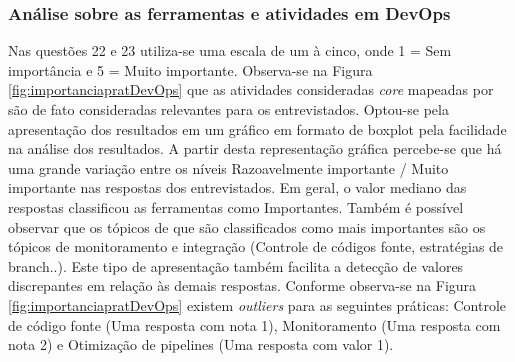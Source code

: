 \documentclass[twoside,english,brazilian]{UNISINOSartigo}
\begin{document}
\subsubsection{Análise sobre as ferramentas e atividades em DevOps}
Nas questões 22 e 23 utiliza-se uma escala de um à cinco, onde 1 = Sem importância e 5 = Muito importante.
Observa-se na Figura \ref{fig:importanciapratDevOps} que as atividades consideradas \textit{core} mapeadas por  são de fato consideradas relevantes para os entrevistados. Optou-se pela apresentação dos resultados em um gráfico em formato de boxplot pela facilidade na análise dos resultados. A partir desta representação gráfica percebe-se que há uma grande variação entre os níveis Razoavelmente importante / Muito importante nas respostas dos entrevistados. Em geral, o valor mediano das respostas classificou as ferramentas como Importantes. Também é possível observar que os tópicos de que são classificados como mais importantes são os tópicos de monitoramento e integração (Controle de códigos fonte, estratégias de branch..). 
Este tipo de apresentação também facilita a detecção de valores discrepantes em relação às demais respostas. Conforme observa-se na Figura \ref{fig:importanciapratDevOps} existem \textit{outliers} para as seguintes práticas: Controle de código fonte (Uma resposta com nota 1), Monitoramento (Uma resposta com nota 2) e Otimização de pipelines (Uma resposta com valor 1).
\end{document}
